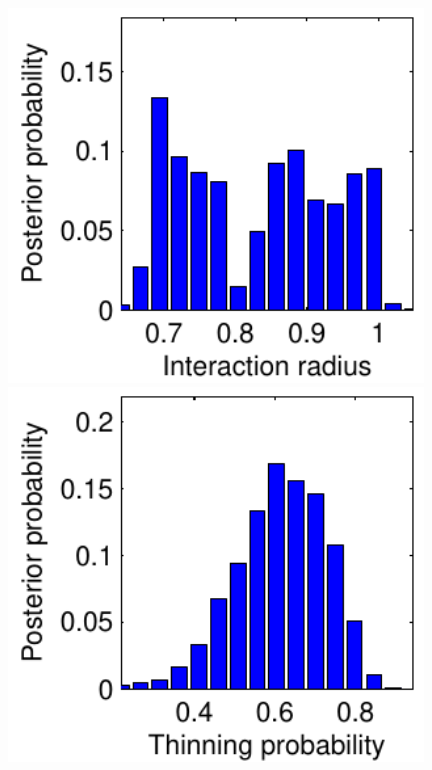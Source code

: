 \documentclass{statsoc}
\begin{document}
  \begin{figure}
  \centering
  \begin{minipage}[b]{0.245\linewidth}
  \centering
    \includegraphics[width=0.98\textwidth]{figs/plot_swedish_r_prob.pdf} 
  \end{minipage}
  \begin{minipage}[b]{0.245\linewidth}
  \centering
    \includegraphics[width=0.98\textwidth]{figs/plot_swedish_p_thin.pdf} 

\end{minipage}
\end{figure}
\end{document}

